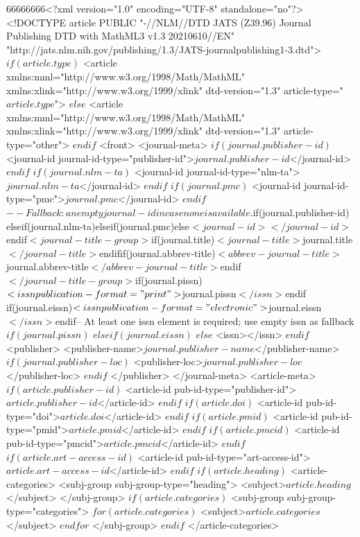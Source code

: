 66666666<?xml version="1.0" encoding="UTF-8" standalone="no"?>
<!DOCTYPE article PUBLIC "-//NLM//DTD JATS (Z39.96) Journal Publishing DTD with MathML3 v1.3 20210610//EN" "http://jats.nlm.nih.gov/publishing/1.3/JATS-journalpublishing1-3.dtd"> 
$if(article.type)$
<article xmlns:mml="http://www.w3.org/1998/Math/MathML" xmlns:xlink="http://www.w3.org/1999/xlink" dtd-version="1.3" article-type="$article.type$">
$else$
<article xmlns:mml="http://www.w3.org/1998/Math/MathML" xmlns:xlink="http://www.w3.org/1999/xlink" dtd-version="1.3" article-type="other">
$endif$
<front>
<journal-meta>
$if(journal.publisher-id)$
<journal-id journal-id-type="publisher-id">$journal.publisher-id$</journal-id>
$endif$
$if(journal.nlm-ta)$
<journal-id journal-id-type="nlm-ta">$journal.nlm-ta$</journal-id>
$endif$
$if(journal.pmc)$
<journal-id journal-id-type="pmc">$journal.pmc$</journal-id>
$endif$
$-- Fallback: an empty journal-id in case none is available.
$if(journal.publisher-id)$
$elseif(journal.nlm-ta)$
$elseif(journal.pmc)$
$else$
<journal-id></journal-id>
$endif$
<journal-title-group>
$if(journal.title)$
<journal-title>$journal.title$</journal-title>
$endif$
$if(journal.abbrev-title)$
<abbrev-journal-title>$journal.abbrev-title$</abbrev-journal-title>
$endif$
</journal-title-group>
$if(journal.pissn)$
<issn publication-format="print">$journal.pissn$</issn>
$endif$
$if(journal.eissn)$
<issn publication-format="electronic">$journal.eissn$</issn>
$endif$
$-- At least one issn element is required; use empty issn as fallback
$if(journal.pissn)$
$elseif(journal.eissn)$
$else$
<issn></issn>
$endif$
<publisher>
<publisher-name>$journal.publisher-name$</publisher-name>
$if(journal.publisher-loc)$
<publisher-loc>$journal.publisher-loc$</publisher-loc>
$endif$
</publisher>
</journal-meta>
<article-meta>
$if(article.publisher-id)$
<article-id pub-id-type="publisher-id">$article.publisher-id$</article-id>
$endif$
$if(article.doi)$
<article-id pub-id-type="doi">$article.doi$</article-id>
$endif$
$if(article.pmid)$
<article-id pub-id-type="pmid">$article.pmid$</article-id>
$endif$
$if(article.pmcid)$
<article-id pub-id-type="pmcid">$article.pmcid$</article-id>
$endif$
$if(article.art-access-id)$
<article-id pub-id-type="art-access-id">$article.art-access-id$</article-id>
$endif$
$if(article.heading)$
<article-categories>
<subj-group subj-group-type="heading">
<subject>$article.heading$</subject>
</subj-group>
$if(article.categories)$
<subj-group subj-group-type="categories">
$for(article.categories)$
<subject>$article.categories$</subject>
$endfor$
</subj-group>
$endif$
</article-categories>

